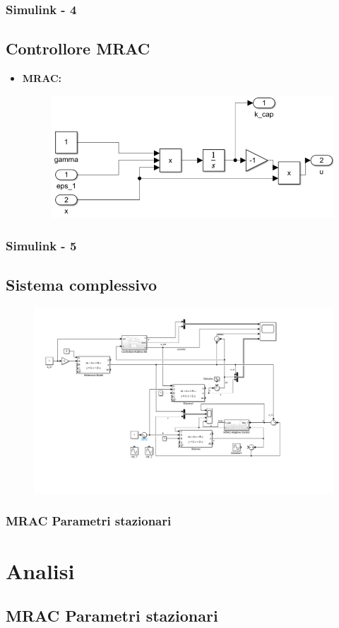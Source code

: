 \documentclass{beamer}
\begin{document}
\begin{frame}
	\frametitle{Simulink - 4}%
	\subsection{Controllore MRAC}
	\begin{itemize}
		\item \textbf{MRAC:}
		\begin{figure}
			\includegraphics[scale=0.4]{2022-05-19-18-40-36.png}%
		\end{figure}
	\end{itemize}
\end{frame}
\begin{frame}
	\frametitle{Simulink - 5}%
	\subsection{Sistema complessivo}
\begin{figure}[t]
	\includegraphics[scale=0.28]{2022-05-19-18-44-46.png}%
\end{figure}
\end{frame}
\begin{frame}
	\frametitle{MRAC Parametri stazionari}
	\section{Analisi}
	\subsection{MRAC Parametri stazionari}

\end{frame}
\end{document}
